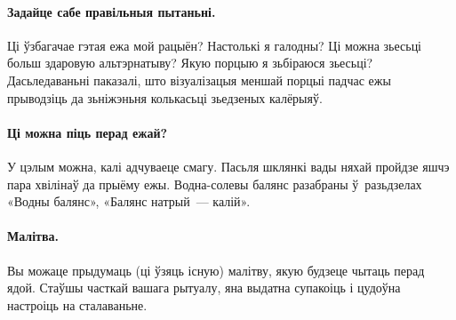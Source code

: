 
\paragraph{Задайце сабе правільныя пытаньні.}
Ці ўзбагачае гэтая ежа мой рацыён? Настолькі я галодны? Ці можна зьесьці больш здаровую альтэрнатыву? Якую порцыю я зьбіраюся зьесьці? Дасьледаваньні паказалі, што візуалізацыя меншай порцыі падчас ежы прыводзіць да зьніжэньня колькасьці зьедзеных калёрыяў.

\paragraph{Ці можна піць перад ежай?}
У цэлым можна, калі адчуваеце смагу. Пасьля шклянкі вады няхай пройдзе яшчэ пара хвілінаў да прыёму ежы. Водна-солевы балянс разабраны ў~разьдзелах «Водны балянс», «Балянс натрый~--- калій».


\paragraph{Малітва.}
Вы можаце прыдумаць (ці ўзяць існую) малітву, якую будзеце чытаць перад ядой. Стаўшы часткай вашага рытуалу, яна выдатна супакоіць і цудоўна настроіць на сталаваньне.
